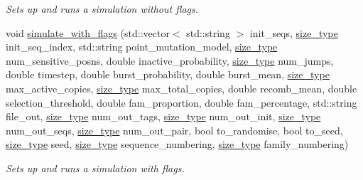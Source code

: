 \begin{DoxyCompactItemize}
\begin{DoxyCompactList}\small\item\em Sets up and runs a simulation without flags. \end{DoxyCompactList}\item 
void \hyperlink{namespaceretrocombinator_a3d34bdb68843d370ccb2374dfb8e9eac}{simulate\+\_\+with\+\_\+flags} (std\+::vector$<$ std\+::string $>$ init\+\_\+seqs, \hyperlink{namespaceretrocombinator_a8e1541b50cee66a791df4c437ccbb385}{size\+\_\+type} init\+\_\+seq\+\_\+index, std\+::string point\+\_\+mutation\+\_\+model, \hyperlink{namespaceretrocombinator_a8e1541b50cee66a791df4c437ccbb385}{size\+\_\+type} num\+\_\+sensitive\+\_\+posns, double inactive\+\_\+probability, \hyperlink{namespaceretrocombinator_a8e1541b50cee66a791df4c437ccbb385}{size\+\_\+type} num\+\_\+jumps, double timestep, double burst\+\_\+probability, double burst\+\_\+mean, \hyperlink{namespaceretrocombinator_a8e1541b50cee66a791df4c437ccbb385}{size\+\_\+type} max\+\_\+active\+\_\+copies, \hyperlink{namespaceretrocombinator_a8e1541b50cee66a791df4c437ccbb385}{size\+\_\+type} max\+\_\+total\+\_\+copies, double recomb\+\_\+mean, double selection\+\_\+threshold, double fam\+\_\+proportion, double fam\+\_\+percentage, std\+::string file\+\_\+out, \hyperlink{namespaceretrocombinator_a8e1541b50cee66a791df4c437ccbb385}{size\+\_\+type} num\+\_\+out\+\_\+tags, \hyperlink{namespaceretrocombinator_a8e1541b50cee66a791df4c437ccbb385}{size\+\_\+type} num\+\_\+out\+\_\+init, \hyperlink{namespaceretrocombinator_a8e1541b50cee66a791df4c437ccbb385}{size\+\_\+type} num\+\_\+out\+\_\+seqs, \hyperlink{namespaceretrocombinator_a8e1541b50cee66a791df4c437ccbb385}{size\+\_\+type} num\+\_\+out\+\_\+pair, bool to\+\_\+randomise, bool to\+\_\+seed, \hyperlink{namespaceretrocombinator_a8e1541b50cee66a791df4c437ccbb385}{size\+\_\+type} seed, \hyperlink{namespaceretrocombinator_a8e1541b50cee66a791df4c437ccbb385}{size\+\_\+type} sequence\+\_\+numbering, \hyperlink{namespaceretrocombinator_a8e1541b50cee66a791df4c437ccbb385}{size\+\_\+type} family\+\_\+numbering)
\begin{DoxyCompactList}\small\item\em Sets up and runs a simulation with flags. \end{DoxyCompactList}\item 

\end{DoxyCompactItemize}
